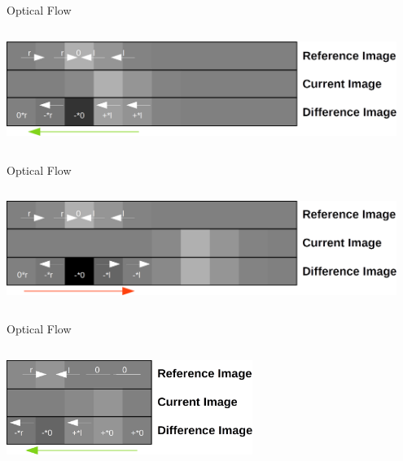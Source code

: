 \documentclass[aspectratio=169,12pt]{beamer}
\begin{document}
\begin{frame}{Optical Flow}
  \begin{columns}[c]
    \column{\dimexpr\paperwidth}
    \begin{center}
      \includegraphics[width=0.95\textwidth]{img/optical_flow_intuitive_1.png}
    \end{center}
  \end{columns}
\end{frame}

\begin{frame}{Optical Flow}
  \begin{columns}[c]
    \column{\dimexpr\paperwidth}
    \begin{center}
      \includegraphics[width=0.95\textwidth]{img/optical_flow_intuitive_2.png}
    \end{center}
  \end{columns}
\end{frame}

\begin{frame}{Optical Flow}
  \begin{columns}[c]
    \column{\dimexpr\paperwidth}
    \begin{center}
      \includegraphics[width=0.6\textwidth]{img/optical_flow_intuitive_3.png}
    \end{center}
  \end{columns}
\end{frame}
\end{document}

